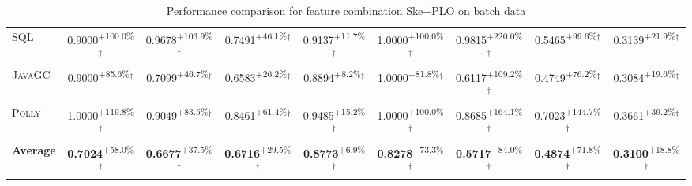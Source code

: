 \begin{table}[htbp]
\begin{tabular}{l|cccc|cccc}
\textsc{SQL} & \cellcolor{green!30}0.9000\textsuperscript{+100.0\%}$^\dagger$ & \cellcolor{green!30}0.9678\textsuperscript{+103.9\%}$^\dagger$ & \cellcolor{green!30}0.7491\textsuperscript{+46.1\%}$^\dagger$ & \cellcolor{green!30}0.9137\textsuperscript{+11.7\%}$^\dagger$ & \cellcolor{green!30}1.0000\textsuperscript{+100.0\%}$^\dagger$ & \cellcolor{green!30}0.9815\textsuperscript{+220.0\%}$^\dagger$ & \cellcolor{green!30}0.5465\textsuperscript{+99.6\%}$^\dagger$ & \cellcolor{green!30}0.3139\textsuperscript{+21.9\%}$^\dagger$ \\
\textsc{JavaGC} & \cellcolor{green!30}0.9000\textsuperscript{+85.6\%}$^\dagger$ & \cellcolor{green!30}0.7099\textsuperscript{+46.7\%}$^\dagger$ & \cellcolor{green!30}0.6583\textsuperscript{+26.2\%}$^\dagger$ & \cellcolor{green!30}0.8894\textsuperscript{+8.2\%}$^\dagger$ & \cellcolor{green!30}1.0000\textsuperscript{+81.8\%}$^\dagger$ & \cellcolor{green!30}0.6117\textsuperscript{+109.2\%}$^\dagger$ & \cellcolor{green!30}0.4749\textsuperscript{+76.2\%}$^\dagger$ & \cellcolor{green!30}0.3084\textsuperscript{+19.6\%}$^\dagger$ \\
\textsc{Polly} & \cellcolor{green!30}1.0000\textsuperscript{+119.8\%}$^\dagger$ & \cellcolor{green!30}0.9049\textsuperscript{+83.5\%}$^\dagger$ & \cellcolor{green!30}0.8461\textsuperscript{+61.4\%}$^\dagger$ & \cellcolor{green!30}0.9485\textsuperscript{+15.2\%}$^\dagger$ & \cellcolor{green!30}1.0000\textsuperscript{+100.0\%}$^\dagger$ & \cellcolor{green!30}0.8685\textsuperscript{+164.1\%}$^\dagger$ & \cellcolor{green!30}0.7023\textsuperscript{+144.7\%}$^\dagger$ & \cellcolor{green!30}0.3661\textsuperscript{+39.2\%}$^\dagger$ \\
\hline
\textbf{Average} & \cellcolor{green!30}\textbf{0.7024}\textsuperscript{+58.0\%}$^\dagger$ & \cellcolor{green!30}\textbf{0.6677}\textsuperscript{+37.5\%}$^\dagger$ & \cellcolor{green!30}\textbf{0.6716}\textsuperscript{+29.5\%}$^\dagger$ & \cellcolor{green!30}\textbf{0.8773}\textsuperscript{+6.9\%}$^\dagger$ & \cellcolor{green!30}\textbf{0.8278}\textsuperscript{+73.3\%}$^\dagger$ & \cellcolor{green!30}\textbf{0.5717}\textsuperscript{+84.0\%}$^\dagger$ & \cellcolor{green!30}\textbf{0.4874}\textsuperscript{+71.8\%}$^\dagger$ & \cellcolor{green!30}\textbf{0.3100}\textsuperscript{+18.8\%}$^\dagger$ \\
\hline
\end{tabular}
\caption{Performance comparison for feature combination Ske+PLO on batch data}
\label{tab:combo_Ske_PLO_performance_batch}
\end{table}
